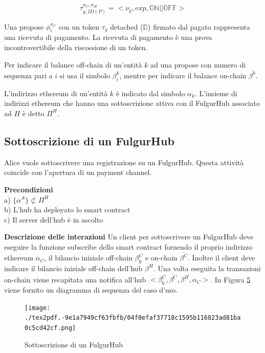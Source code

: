 \documentclass[12pt,italian,]{book}
\begin{document}
\begin{equation}
\label{Un esempio di token}
\tau^{\sigma_C,\sigma_H}_{y, ID(P)} = <\nu_y, exp, \mathbb{ON} || \mathbb{OFF}>
\end{equation}

Una propose \(\phi^{\sigma_C}_i\) con un token \(\tau_y\) detached (\(\mathbb{D}\)) firmato dal pagato rappresenta una ricevuta di pagamento. La ricevuta di pagamento è una prova incontrovertibile della riscossione di un token.

Per indicare il balance off-chain di un'entità \(k\) ad una propose con numero di sequenza pari a \(i\) si usa il simbolo \(\beta^k_i\), mentre per indicare il balance on-chain \(\overline{\beta^k}\).

L'indirizzo ethereum di un'entità \(k\) è indicato dal simbolo \(\alpha_k\). L'insieme di indirizzi ethereum che hanno una sottoscrizione attiva con il FulgurHub associato ad \(H\) è detto \(\Pi^H\).

\hypertarget{sottoscrizione-di-un-fulgurhub}{%
\subsection{Sottoscrizione di un FulgurHub}\label{sottoscrizione-di-un-fulgurhub}}

Alice vuole sottoscrivere una registrazione su un FulgurHub. Questa attività coincide con l'apertura di un payment channel.

\textbf{\textbf{Precondizioni}}\\
a) \(\{\alpha^A\} \not\subset \Pi^H\)\\
b) L'hub ha deployato lo smart contract\\
c) Il server dell'hub è in ascolto

\textbf{\textbf{Descrizione delle interazioni}} Un client per sottoscrivere un FulgurHub deve eseguire la funzione subscribe dello smart contract fornendo il proprio indirizzo ethereum \(\alpha_C\), il bilancio iniziale off-chain \(\beta^C_0\) e on-chain \(\overline{\beta^C}\). Inoltre il client deve indicare il bilancio iniziale off-chain dell'hub \(\beta^H\). Una volta eseguita la transazioni on-chain viene recapitata una notifica all'hub \(<\beta^C_0, \overline{\beta^C}, \beta^H, \alpha_C>\). In Figura \protect\hyperlink{sottoscrizione-fulgur-hub}{5} viene fornito un diagramma di sequenza del caso d'uso.

\begin{figure}
\centering
\texttt{[image: ./tex2pdf.-9e1a7949cf63fbfb/04f0efaf37718c1595b116823ad81ba0c5cd42cf.png]}
\caption{\protect\hypertarget{sottoscrizione-fulgur-hub}{}{}Sottoscrizione di un FulgurHub}
\end{figure}
\end{document}
